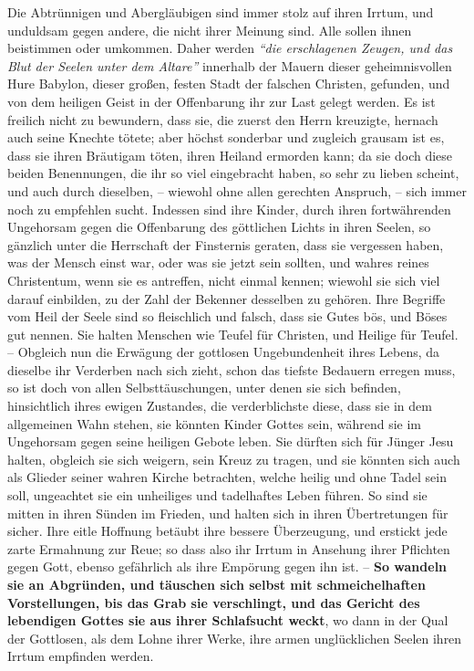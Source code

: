 Die Abtrünnigen und Abergläubigen sind immer stolz auf ihren Irrtum, und
unduldsam gegen andere, die nicht ihrer Meinung sind.
Alle sollen ihnen beistimmen oder umkommen.
Daher werden
\textit{"`die erschlagenen Zeugen, und das Blut der Seelen unter
dem Altare"'}
innerhalb der Mauern dieser geheimnisvollen Hure Babylon, dieser großen, festen Stadt
der falschen Christen, gefunden, und von dem heiligen Geist in der Offenbarung
ihr zur Last gelegt werden.
Es ist freilich nicht zu bewundern, dass sie, die zuerst den Herrn kreuzigte,
hernach auch seine Knechte tötete;
aber höchst sonderbar und zugleich grausam ist es, dass sie ihren Bräutigam
töten, ihren Heiland ermorden kann;
da sie doch diese beiden Benennungen, die ihr so viel eingebracht haben, so sehr
zu lieben scheint, und auch durch dieselben,
-- wiewohl ohne allen gerechten Anspruch, --
sich immer noch zu empfehlen sucht.
Indessen sind ihre Kinder, durch ihren fortwährenden Ungehorsam gegen die
Offenbarung des göttlichen Lichts in ihren Seelen, so gänzlich unter die
Herrschaft der Finsternis geraten, dass sie vergessen haben, was der Mensch
einst war, oder was sie jetzt sein sollten, und wahres reines Christentum, wenn
sie es antreffen, nicht einmal kennen;
wiewohl sie sich viel darauf einbilden, zu der Zahl der Bekenner desselben zu
gehören.
Ihre Begriffe vom Heil der Seele sind so fleischlich und falsch, dass sie Gutes
bös, und Böses gut nennen.
Sie halten Menschen wie Teufel für Christen, und Heilige für Teufel.
-- Obgleich nun die Erwägung der gottlosen Ungebundenheit ihres Lebens, da
dieselbe ihr Verderben nach sich zieht, schon das tiefste Bedauern erregen muss,
so ist doch von allen Selbsttäuschungen, unter denen sie sich befinden,
hinsichtlich ihres ewigen Zustandes, die verderblichste diese, dass sie in dem
allgemeinen Wahn stehen, sie könnten Kinder Gottes sein, während sie im
Ungehorsam gegen seine heiligen Gebote leben.
Sie dürften sich für Jünger Jesu halten, obgleich sie sich weigern, sein Kreuz
zu tragen, und sie könnten sich auch als Glieder seiner wahren Kirche
betrachten, welche heilig und ohne Tadel sein soll, ungeachtet sie ein
unheiliges und tadelhaftes Leben führen.
So sind sie mitten in ihren Sünden im Frieden, und halten sich in ihren
Übertretungen für sicher.
Ihre eitle Hoffnung betäubt ihre bessere Überzeugung, und erstickt jede zarte
Ermahnung zur Reue;
so dass also ihr Irrtum in Ansehung ihrer Pflichten gegen Gott, ebenso
gefährlich als ihre Empörung gegen ihn ist. \label{ref:01_07_selbstbetrug}
-- \textbf{So wandeln sie an Abgründen, und täuschen sich selbst mit
schmeichelhaften Vorstellungen, bis das Grab sie verschlingt, und das
Gericht des lebendigen
Gottes sie aus ihrer Schlafsucht weckt}, wo dann in der Qual der Gottlosen, als
dem Lohne ihrer Werke, ihre armen unglücklichen Seelen ihren Irrtum empfinden
werden.

